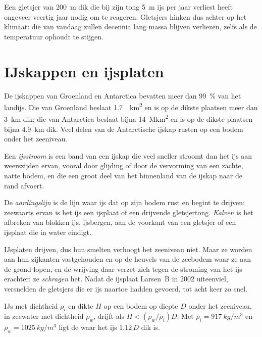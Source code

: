 Een gletsjer van \qty{200}{m} dik die bij zijn tong \qty{5}{m} ijs per jaar verliest
heeft ongeveer veertig jaar nodig om te reageren. Gletsjers hinken dus achter op het
klimaat: die van vandaag zullen decennia lang massa blijven verliezen, zelfs als de
temperatuur ophoudt te stijgen.

\section{IJskappen en ijsplaten}\label{sec:b3:glaciology:ice-sheets}

De ijskappen van Groenland en Antarctica bevatten meer dan
\qty{99}{\percent} van het landijs. Die van Groenland beslaat \qty{1.7}{\mega
km^2} en is op de dikste plaatsen meer dan \qty{3}{km} dik; die van Antarctica
beslaat bijna \qty{14}{\mega km^2} en is op de dikste plaatsen bijna \qty{4.9}{km} dik. Veel
delen van de Antarctische ijskap rusten op een bodem onder het zeeniveau.

\begin{definition}[Ijsstroom]\label{def:b3:glaciology:ice-stream}
Een \emph{ijsstroom} is een band van een ijskap die veel sneller
stroomt dan het ijs aan weerszijden ervan, vooral door glijding of door de
vervorming van een zachte, natte bodem, en die een groot deel van het binnenland
van de ijskap naar de rand afvoert.
\end{definition}

\begin{definition}\label{def:b3:glaciology:grounding-line}
De \emph{aardingslijn} is de lijn waar ijs dat op zijn bodem
rust en begint te drijven: zeewaarts ervan is het ijs een ijsplaat of een
drijvende gletsjertong. \emph{Kalven} is het afbreken van
blokken ijs, ijsbergen, aan de voorkant van een gletsjer of een ijsplaat die
in water eindigt.
\end{definition}

IJsplaten drijven, dus hun smelten verhoogt het zeeniveau niet. Maar ze worden
aan hun zijkanten vastgehouden en op de heuvels van de zeebodem waar ze
aan de grond lopen, en de wrijving daar verzet zich tegen de stroming van het ijs
erachter: ze \emph{schragen} het. Nadat de ijsplaat Larsen~B in 2002 uiteenviel,
versnelden de gletsjers die er ijs naartoe hadden gevoerd, tot acht keer zo snel.

\begin{proposition}[Drijfvermogen]\label{prop:b3:glaciology:flotation}
IJs met dichtheid $\rho_i$ en dikte $H$ op een bodem op diepte $D$ onder het zeeniveau,
in zeewater met dichtheid $\rho_w$, drijft als $H < (\rho_w/\rho_i)D$.
Met $\rho_i = \qty{917}{kg/m^3}$ en $\rho_w = \qty{1025}{kg/m^3}$ ligt de
 waar het ijs $1.12\,D$ dik is.
\end{proposition}


